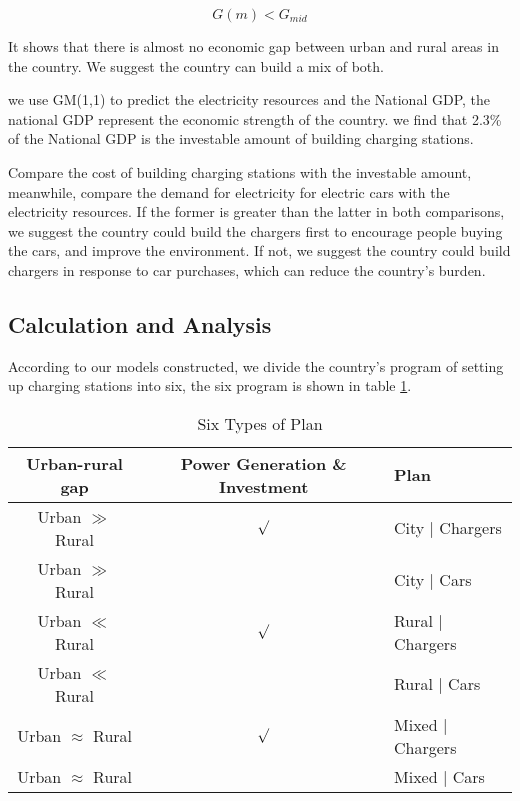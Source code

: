 \documentclass{mcmthesis}
\begin{document}
$$G(m)<G_{mid}$$

\par It shows that there is almost no economic gap between urban and rural areas in the country. We suggest the country can build a mix of both.

\par we use GM(1,1) to predict the electricity resources and the National GDP, the national GDP represent the economic strength of the country. we find that 2.3\% of the National GDP is the investable amount of building charging stations. 

\par Compare the cost of building charging stations with the investable amount, meanwhile, compare the demand for electricity for electric cars with the electricity resources. If the former is greater than the latter in both comparisons, we suggest the country could build the chargers first to encourage people buying the cars, and improve the environment. If not, we suggest the country could build chargers in response to car purchases, which can reduce the country’s burden.




\subsection{Calculation and Analysis}
\par According to our models constructed, we divide the country's program of setting up charging stations into six, the six program is shown in table \ref{tab:6 Types of Plan}.

\begin{table}[h]
\centering
\caption{Six Types of Plan}\label{tab:6 Types of Plan}
\begin{tabular}{ccl}
\toprule
Urban-rural gap & Power Generation \& Investment & Plan\\ 
\midrule
Urban $\gg$ Rural & $\surd$ & City | Chargers\\
Urban $\gg$ Rural &  		 & City | Cars\\
Urban $\ll$ Rural & $\surd$ & Rural | Chargers\\
Urban $\ll$ Rural &  	     & Rural | Cars\\
Urban $\approx$ Rural & $\surd$ & Mixed | Chargers\\
Urban $\approx$ Rural &  & Mixed | Cars\\

\bottomrule
\end{tabular}
\end{table}
\end{document}
